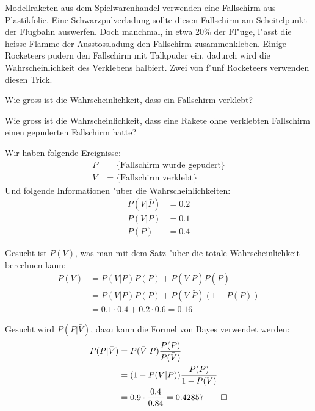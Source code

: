 Modellraketen aus dem Spielwarenhandel verwenden eine Fallschirm aus
Plastikfolie. Eine Schwarzpulverladung sollte diesen Fallschirm am
Scheitelpunkt der Flugbahn auswerfen. Doch manchmal, in etwa 20\%
der Fl"uge, l"asst die heisse
Flamme der Ausstossladung den Fallschirm zusammenkleben. Einige
Rocketeers pudern den Fallschirm mit Talkpuder ein, dadurch wird
die Wahrscheinlichkeit des Verklebens halbiert.
Zwei von f"unf Rocketeers verwenden diesen Trick.
\begin{teilaufgaben}
\item Wie gross ist die Wahrscheinlichkeit, dass ein Fallschirm
verklebt?
\item Wie gross ist die Wahrscheinlichkeit, dass eine Rakete
ohne verklebten Fallschirm einen gepuderten Fallschirm hatte?
\end{teilaufgaben}

\begin{loesung}
Wir haben folgende Ereignisse:
\begin{align*}
P&=\{\text{Fallschirm wurde gepudert}\}\\
V&=\{\text{Fallschirm verklebt}\}
\end{align*}
Und folgende Informationen "uber die Wahrscheinlichkeiten:
\begin{align*}
P(V|\bar P)&=0.2\\
P(V|P)&=0.1\\
P(P)&=0.4
\end{align*}
\begin{teilaufgaben}
\item Gesucht ist $P(V)$, was man mit dem Satz "uber die totale
Wahrscheinlichkeit berechnen kann:
\begin{align*}
P(V)&=P(V|P)P(P)+P(V|\bar P)P(\bar P)\\
&=P(V|P)P(P)+P(V|\bar P)(1-P(P))\\
&=0.1\cdot 0.4+0.2\cdot 0.6=0.16
\end{align*}
\item Gesucht wird $P(P|\bar V)$, dazu kann die Formel von Bayes verwendet
werden:
\begin{align*}
P(P|\bar V)
&=
P(\bar V |P)\frac{P(P)}{P(\bar V)}
\\
&=(1-P(V|P))\frac{P(P)}{1-P(V)}\\
&=
0.9 \cdot\frac{0.4}{0.84}=0.42857
\qedhere
\end{align*}
\end{teilaufgaben}
\end{loesung}


